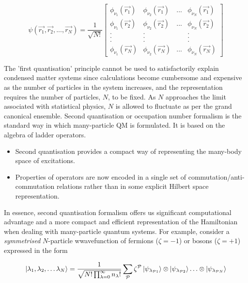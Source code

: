 \begin{equation*}
    \psi(\vec{r_{1}}, \vec{r_{2}},..., \vec{r_{N}}) = \frac{1}{\sqrt{N!}} \begin{bmatrix}
        \phi_{\nu_{1}}(\vec{r_{1}}) & \phi_{\nu_{2}}(\vec{r_{1}}) & ... & \phi_{\nu_{N}}(\vec{r_{1}}) \\
        \phi_{\nu_{1}}(\vec{r_{2}}) & \phi_{\nu_{2}}(\vec{r_{2}}) & ... & \phi_{\nu_{N}}(\vec{r_{2}}) \\
        . & . &  & . \\
        . & . &  & . \\
        . & . &  & . \\
        \phi_{\nu_{1}}(\vec{r_{N}}) & \phi_{\nu_{2}}(\vec{r_{N}}) & ... & \phi_{\nu_{N}}(\vec{r_{N}})
    \end{bmatrix}
\end{equation*}

The 'first quantisation' principle cannot be used to satisfactorily explain condensed matter systems since calculations become cumbersome and expensive as the number of particles in the system increases, and the representation requires the number of particles, $N$, to be fixed. As $N$ approaches the limit associated with statistical physics, $N$ is allowed to fluctuate as per the grand canonical ensemble. Second quantisation or occupation number formalism is the standard way in which many-particle QM is formulated. It is based on the algebra of ladder operators.

\begin{itemize}
    \item Second quantisation provides a compact way of representing the many-body space of excitations.
    \item Properties of operators are now encoded in a single set of commutation/anti-commutation relations rather than in some explicit Hilbert space representation. 
\end{itemize}

In essence, second quantisation formalism offers us significant computational advantage and a more compact and efficient representation of the Hamiltonian when dealing with many-particle quantum systems. For example, consider a \textit{symmetrised} $N$-particle wwavefunction of fermions ($\zeta = -1$) or bosons ($\zeta = +1$) expressed in the form 

\begin{equation}
	\ket{\lambda_{1}, \lambda_{2},\ldots \lambda_{N}} = \frac{1}{\sqrt{N! \prod_{\lambda=0}^{\infty}n_{\lambda}!}} \sum_{\mathcal{P}}\zeta^{\mathcal{P}} \ket{\psi_{\lambda_{\mathcal{P}1}}} \otimes \ket{\psi_{\lambda_{\mathcal{P}2}}} \ldots \otimes \ket{\psi_{\lambda_{\mathcal{P}N}}}
\end{equation}

